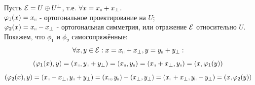 \begin{example1}
    Пусть $\E = U \oplus U^\perp$, т.е. $\forall x = x_\shortparallel + x_\perp$.\\
    $\phi_1(x) = x_\shortparallel$ - ортогональное проектирование на $U$;\\
    $\phi_2(x) = x_\shortparallel - x_\perp$ - ортогональная симметрия, или отражение $\E$ относительно $U$.\\
    Покажем, что $\phi_1$ и $\phi_2$ самосопряжённые:
    $$\forall x,y \in \E: x = x_\shortparallel + x_\perp, y = y_\shortparallel + y_\perp :$$
    $$(\phi_1(x), y) = (x_\shortparallel, y_\shortparallel + y_\perp) = (x_\shortparallel, y_\shortparallel) = (x_\shortparallel + x_\perp, y_\shortparallel) = (x, \phi_1(y))$$
    $$(\phi_2(x), y) = (x_\shortparallel - x_\perp, y_\shortparallel + y_\perp) = (x_\shortparallel, y_\shortparallel) - (x_\perp, y_\perp) = (x_\shortparallel + x_\perp, y_\shortparallel - y_\perp) = (x, \phi_2(y))$$
\end{example1}

